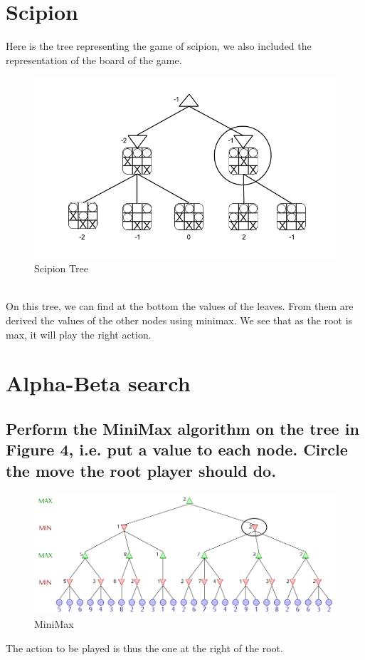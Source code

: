\documentclass[a4paper,10pt]{article}
\begin{document}
	\newpage
	

	\section{Scipion}
		Here is the tree representing the game of scipion, we also included the representation of the board of the game.
		\begin{figure}[h!]
			\centering
				\includegraphics[scale=0.5]{minmax_tree_scipion_specs.png}
			\caption{Scipion Tree}
		\end{figure}\\
		On this tree, we can find at the bottom the values of the leaves. From them are derived the values of the other nodes using minimax. We see that as the root is max, it will play the right action.
	\section{Alpha-Beta search}	
		\subsection{Perform the MiniMax algorithm on the tree in Figure 4, i.e. put a value to each node. Circle the move the root player should do.}
		\begin{figure}[h!]
			\centering
				\includegraphics[scale=0.4]{arbre_minimax.png}
			\caption{MiniMax}
		\end{figure}
		The action to be played is thus the one at the right of the root.
\end{document}
